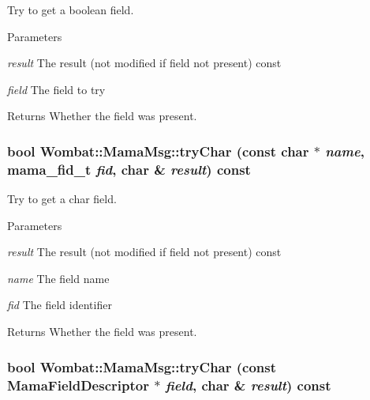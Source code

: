 Try to get a boolean field. 
\begin{DoxyParams}{Parameters}
\item[{\em result}]The result (not modified if field not present) const \item[{\em field}]The field to try \end{DoxyParams}
\begin{DoxyReturn}{Returns}
Whether the field was present. 
\end{DoxyReturn}
\hypertarget{classWombat_1_1MamaMsg_af750343c41da35bccb56a355d4cc6e12}{
\subsubsection[{tryChar}]{\setlength{\rightskip}{0pt plus 5cm}bool Wombat::MamaMsg::tryChar (const char $\ast$ {\em name}, \/  mama\_\-fid\_\-t {\em fid}, \/  char \& {\em result}) const}}
\label{classWombat_1_1MamaMsg_af750343c41da35bccb56a355d4cc6e12}


Try to get a char field. 
\begin{DoxyParams}{Parameters}
\item[{\em result}]The result (not modified if field not present) const \item[{\em name}]The field name \item[{\em fid}]The field identifier \end{DoxyParams}
\begin{DoxyReturn}{Returns}
Whether the field was present. 
\end{DoxyReturn}
\hypertarget{classWombat_1_1MamaMsg_a70ac705d1634d03c8a1d3a1504b9e9d0}{
\subsubsection[{tryChar}]{\setlength{\rightskip}{0pt plus 5cm}bool Wombat::MamaMsg::tryChar (const {\bf MamaFieldDescriptor} $\ast$ {\em field}, \/  char \& {\em result}) const}}
\label{classWombat_1_1MamaMsg_a70ac705d1634d03c8a1d3a1504b9e9d0}


